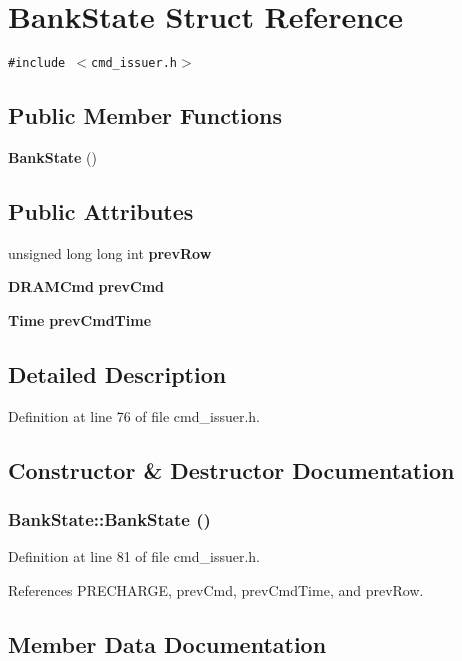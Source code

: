 \section{BankState Struct Reference}
\label{structBankState}
{\tt \#include $<$cmd\_\-issuer.h$>$}

\subsection*{Public Member Functions}
\begin{CompactItemize}
\item 
{\bf BankState} ()
\end{CompactItemize}
\subsection*{Public Attributes}
\begin{CompactItemize}
\item 
unsigned long long int {\bf prevRow}
\item 
{\bf DRAMCmd} {\bf prevCmd}
\item 
{\bf Time} {\bf prevCmdTime}
\end{CompactItemize}


\subsection{Detailed Description}


Definition at line 76 of file cmd\_\-issuer.h.

\subsection{Constructor \& Destructor Documentation}
\subsubsection[{BankState}]{\setlength{\rightskip}{0pt plus 5cm}BankState::BankState ()\hspace{0.3cm}{\tt  [inline]}}\label{structBankState_9ff46c7c5f85b3f1019724530d1f7833}




Definition at line 81 of file cmd\_\-issuer.h.

References PRECHARGE, prevCmd, prevCmdTime, and prevRow.

\subsection{Member Data Documentation}
